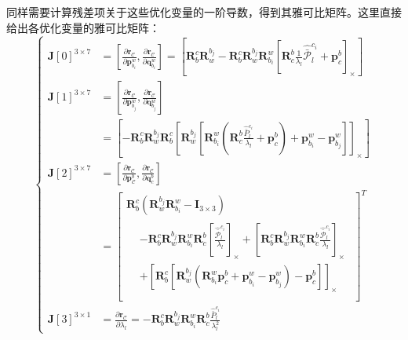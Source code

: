 同样需要计算残差项关于这些优化变量的一阶导数，得到其雅可比矩阵。这里直接给出各优化变量的雅可比矩阵：
\begin{equation}
\label{eqn:4.21}
\left\{
\begin{aligned}
\mathbf{ J}[0]^{3 \times 7} &= \left[\frac{\partial \mathbf{r}_{\mathcal{C}}}{\partial \mathbf{p}_{b_{i}}^{w}}, \frac{\partial \mathbf{r}_{\mathcal{C}}}{\partial \mathbf{q}_{b_{i}}^{w}}\right]
=\left[\mathbf{R}_{b}^{c} \mathbf{R}_{w}^{b_{j}}-\mathbf{R}_{b}^{c} \mathbf{R}_{w}^{b_{j}} \mathbf{R}_{b_{i}}^{w}\left[\mathbf{R}_{c}^{b} \frac{1}{\lambda_{l}} \hat{\bar{\mathcal{P}}}_{l}^{c_{i}}+\mathbf{p}_{c}^{b}\right]_\times\right] \\
\mathbf{J}[1]^{3 \times 7}&=\left[\frac{\partial \mathbf{r}_{\mathcal{C}}}{\partial \mathbf{p}_{b_{j}}^{w}}, \frac{\partial \mathbf{r}_{\mathcal{C}}}{\partial \mathbf{q}_{b_{j}}^{w}}\right] \\
&=\left[-\mathbf{R}_{b}^{c} \mathbf{R}_{w}^{b_{j}} \mathbf{R}_{b}^{c}\left[\mathbf{R}_{w}^{b_{j}}\left[\mathbf{R}_{b_{i}}^{w}\left(\mathbf{R}_{c}^{b} \frac{\hat{\bar{P}}_{l}^{c_{i}}}{\lambda_{l}}+\mathbf{p}_{c}^{b}\right)+\mathbf{p}_{b_{i}}^{w}-\mathbf{p}_{b_{j}}^{w}\right]\right]_\times\right] \\
\mathbf{J}[2]^{3 \times 7} &= \left[\frac{\partial \mathbf{r}_{\mathcal{C}}}{\partial \mathbf{p}_{\mathcal{C}}^{b}}, \frac{\partial \mathbf{r}_{\mathcal{C}}}{\partial \mathbf{q}_{c}^{b}}\right] \\
&= \left[ \begin{array}
{c}{\mathbf{R}_{b}^{c}\left(\mathbf{R}_{w}^{b_{j}} \mathbf{R}_{b_{i}}^{w}-\mathbf{I}_{3 \times 3}\right)} \\ 
\begin{aligned}
&{-\mathbf{R}_{b}^{c} \mathbf{R}_{w}^{b_{j}} \mathbf{R}_{b_{i}}^{w} \mathbf{R}_{c}^{b} \left[\frac{\hat{\bar{\mathcal{P}}}_{l}^{c_{i}}}{\lambda_{l}}\right]_\times
	+\left[\mathbf{R}_{b}^{c} \mathbf{R}_{w}^{b_{j}} \mathbf{R}_{b_{i}}^{w} \mathbf{R}_{c}^{b} \frac{\hat{\bar{\mathcal{P}}}_{l}^{c_{i}}}{\lambda_{l}}\right]_\times} \\
	&{+\left[\mathbf{R}_{b}^{c}\left[\mathbf{R}_{w}^{b_{j}}\left(\mathbf{R}_{b_{i}}^{w} \mathbf{p}_{c}^{b}+\mathbf{p}_{b_{i}}^{w}-\mathbf{p}_{b_{j}}^{w}\right)-\mathbf{p}_{c}^{b}\right]\right]_\times}
\end{aligned} \\
\end{array}\right]^{T} \\
\mathbf{J}[3]^{3 \times 1} &=\frac{\partial \mathbf{r}_{\mathcal{C}}}{\partial \lambda_{l}}=-\mathbf{R}_{b}^{c} \mathbf{R}_{w}^{b_{j}} \mathbf{R}_{b_{i}}^{w} \mathbf{R}_{c}^{b} \frac{\hat{\bar{P}}_{l}^{c_{i}}}{\lambda_{l}^{2}}
\end{aligned}
\right.
\end{equation}
